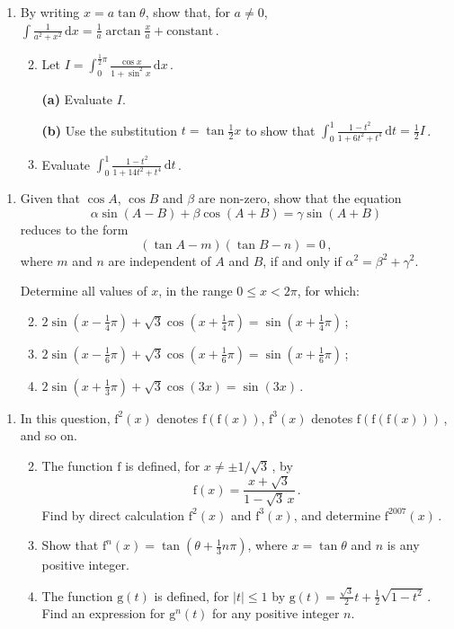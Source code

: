\documentclass[a4, 11pt]{report}
\newlength{\qspace}
\newcounter{qnumber}
\newenvironment{question}%
 {\vspace{\qspace}
  \begin{enumerate}[\bfseries 1\quad][10]%
    \setcounter{enumi}{\value{qnumber}}%
    \item%
 }
{
  \end{enumerate}
  \filbreak
  \stepcounter{qnumber}
 }
\newenvironment{questionparts}[1][1]%
 {
  \begin{enumerate}[\bfseries (i)]%
    \setcounter{enumii}{#1}
    \addtocounter{enumii}{-1}
    \setlength{\itemsep}{5mm}
    \setlength{\parskip}{8pt}
 }
 {
  \end{enumerate}
 }
\def\d{{\mathrm d}}
\def\g{{\mathrm g}}
\def\f{{\mathrm f}}
\def\le{\leqslant}
\newcommand{\ds}{\displaystyle}
\begin{document}
\begin{question}
By writing $x=a\tan\theta$, show that, for $a\ne0$, 
 $\ds \int \frac 1 {a^2+x^2}\,
\d x =\frac 1 a \arctan \frac x a + \text{constant}\,$.


\begin{questionparts}
\item Let $\ds I=\int_0^{\frac{1}{2}\pi} 
\frac {\cos x}{1+\sin^2 x} \, \d x\,$.

\vspace*{2mm}
{\bf (a)} 
 Evaluate $I$.

{\bf (b)} Use the substitution $t=\tan \frac12 x$ to show that
$\ds \int_0^1 \frac {1-t^2}{1+6t^2+t^4} \, \d t = \tfrac12 I\,$.

\item  Evaluate $\ds \int_0^1 \frac {1-t^2}{1+14t^2+t^4} \, \d t \,$.
\end{questionparts}
\end{question}

\begin{question}
Given that $\cos A$, $\cos B$ and $\beta$ are non-zero, show
that
the equation
\[
\alpha \sin(A-B) + \beta \cos(A+B) = \gamma \sin(A+B)
\]
reduces to the form
\[
(\tan A-m)(\tan B-n)=0\,,
\]
where $m$ and $n$ are independent of $A$ and $B$,
if and only if $\alpha^2=\beta^2+\gamma^2$. 

Determine all values of $x$, in the range $0\le x <2\pi$, for which: 
\begin{questionparts}
\item  $2\sin(x-\frac14\pi) + \sqrt 3 \cos(x+\frac14\pi) =
\sin(x+\frac14\pi)\, $;
\item $2\sin(x-\frac16\pi) + \sqrt 3 \cos(x+\frac16\pi) =
\sin(x+\frac16\pi)\, $;
\item  $2\sin(x+\frac13\pi) + \sqrt 3 \cos(3x) =
\sin(3x)\, $.

\end{questionparts}
\end{question}

\begin{question}
In this question, 
$\f^2(x)$ denotes $\f(\f(x))$, $\f^3(x)$ denotes $\f( \f (\f(x)))\,$,
and so on.

\begin{questionparts}
\item 
The function $\f$ is defined, for $x\ne \pm 1/ \sqrt3\,$,  
by 
$$ \f(x) = \ds \frac{x+\sqrt3} {1-\sqrt3\, x }\,.
$$
Find by direct calculation $\f^2(x) $ and $\f^3(x)$, and determine
$\f^{2007}(x)\,$.
\item Show that 
$\f^n(x) = \tan(\theta + \frac 13 n\pi)$, where $x=\tan\theta$
and $n$ is any positive integer.



\item The function $\g(t)$ is defined, for $\vert t\vert\le1$ by 
$\g(t) = \frac {\sqrt3}2 t + \frac 12 \sqrt {1-t^2}\,$.
Find an expression for $\g^n(t)$ for any positive integer $n$.

\end{questionparts}
	\end{question}
	
\end{document}

